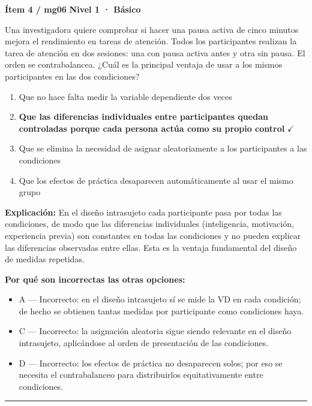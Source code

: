 \documentclass[12pt,a4paper]{article}
\begin{document}
\begin{mdframed}[backgroundcolor=fondogris,linecolor=azul,linewidth=1pt,innerleftmargin=10pt,innerrightmargin=10pt,innertopmargin=7pt,innerbottommargin=7pt]
\textbf{Ítem 4 / mg06} \hfill {\small\bfseries\color{azul} Nivel 1 · Básico}
\end{mdframed}

Una investigadora quiere comprobar si hacer una pausa activa de cinco minutos mejora el rendimiento en tareas de atención. Todos los participantes realizan la tarea de atención en dos sesiones: una con pausa activa antes y otra sin pausa. El orden se contrabalancea. ¿Cuál es la principal ventaja de usar a los mismos participantes en las dos condiciones?

\begin{enumerate}
  \item[A.] Que no hace falta medir la variable dependiente dos veces
  \item[\textbf{\color{verde}B.}] \textbf{\color{verde} Que las diferencias individuales entre participantes quedan controladas porque cada persona actúa como su propio control} \hfill $\checkmark$
  \item[C.] Que se elimina la necesidad de asignar aleatoriamente a los participantes a las condiciones
  \item[D.] Que los efectos de práctica desaparecen automáticamente al usar el mismo grupo
\end{enumerate}

\noindent\textbf{\color{azul}Explicación:} En el diseño intrasujeto cada participante pasa por todas las condiciones, de modo que las diferencias individuales (inteligencia, motivación, experiencia previa) son constantes en todas las condiciones y no pueden explicar las diferencias observadas entre ellas. Esta es la ventaja fundamental del diseño de medidas repetidas.

\noindent\textbf{\color{gris}Por qué son incorrectas las otras opciones:}
\begin{itemize}
  \item {\small A — Incorrecto: en el diseño intrasujeto sí se mide la VD en cada condición; de hecho se obtienen tantas medidas por participante como condiciones haya.}
  \item {\small C — Incorrecto: la asignación aleatoria sigue siendo relevante en el diseño intrasujeto, aplicándose al orden de presentación de las condiciones.}
  \item {\small D — Incorrecto: los efectos de práctica no desaparecen solos; por eso se necesita el contrabalanceo para distribuirlos equitativamente entre condiciones.}
\end{itemize}
\vspace{8pt}\hrule\vspace{10pt}
\end{document}
